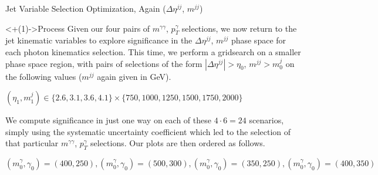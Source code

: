 \documentclass[]{beamer}
\begin{document}
\begin{frame}{Jet Variable Selection Optimization, Again ($\Delta \eta^{jj}$, $m^{jj}$)}
    \begin{block}<+(1)->{Process}
        Given our four pairs of $m^{\gamma \gamma}$, $p_T^{\gamma}$ selections, we now return to the jet kinematic variables to explore significance in the $\Delta \eta^{jj}$, $m^{jj}$ phase space for each photon kinematics selection. This time, we perform a gridsearch on a smaller phase space region, with pairs of selections of the form $|\Delta \eta^{jj}| > \eta_0$, $m^{jj} > m^j_0$ on the following values ($m^{jj}$ again given in GeV).
        
        \smallskip
        
        $(\eta_1, m^j_1) \in \{2.6, 3.1, 3.6, 4.1\} \times \{750, 1000, 1250, 1500, 1750, 2000\}$
        
        \smallskip
        
        We compute significance in just one way on each of these $4 \cdot 6 = 24$ scenarios, simply using the systematic uncertainty coefficient which led to the selection of that particular $m^{\gamma \gamma}$, $p_T^{\gamma}$ selections. Our plots are then ordered as follows.
        
        \smallskip
        
        $(m^\gamma_0, \gamma_0) = (400, 250), (m^\gamma_0, \gamma_0) = (500, 300), (m^\gamma_0, \gamma_0) = (350, 250), (m^\gamma_0, \gamma_0) = (400, 350)$
    \end{block}
    
    \smallskip
    
    \begin{columns}
    \end{columns}
    

\end{frame}
\end{document}
